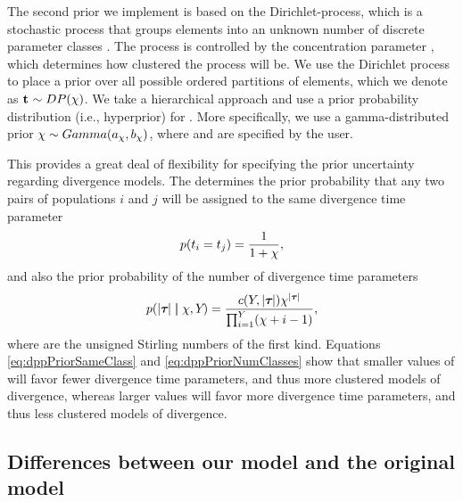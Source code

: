 The second prior we implement is based on the Dirichlet-process, which is a
stochastic process that groups elements into an unknown number of discrete
parameter classes \citep{Ferguson1973,Antoniak1974}.
The process is controlled by the concentration parameter \concentrationParam,
which determines how clustered the process will be.
We use the Dirichlet process to place a prior over all possible ordered
partitions of \npairs{} elements, which we denote as $\mathbf{t_{}} \sim
DP(\chi )$.
We take a hierarchical approach and use a prior probability
distribution (i.e., hyperprior) for \concentrationParam.
More specifically, we use a gamma-distributed prior $\chi \sim
Gamma(a_{\chi}, b_{\chi})$,
where \gammaShape{\concentrationParam} and \gammaScale{\concentrationParam} are
specified by the user.

\begin{linenomath}
This provides a great deal of flexibility for specifying the prior uncertainty
regarding divergence models.
The \concentrationParam determines the prior probability that any two
pairs of populations $i$ and $j$ will be assigned to the same divergence time
parameter
\begin{equation}
    p(t_{i} = t_{j}) = \frac{1}{1 + \chi},
    \label{eq:dppPriorSameClass}
\end{equation}
and also the prior probability of the number of divergence time parameters
\begin{equation}
    p(\lvert \boldsymbol{\tau_{}} \rvert \boldsymbol{\mid} \chi, Y_{}) = 
    \frac{c(Y_{}, \lvert \boldsymbol{\tau_{}} \rvert) \chi^{\lvert \boldsymbol{\tau_{}} \rvert}}
    {\prod_{i=1}^{Y_{}}(\chi + i - 1)},
    \label{eq:dppPriorNumClasses}
\end{equation}
where \stirlingFirst{\cdot}{\cdot} are the unsigned Stirling numbers of the
first kind.
Equations \ref{eq:dppPriorSameClass} and \ref{eq:dppPriorNumClasses} show that
smaller values of \concentrationParam will favor fewer divergence time
parameters, and thus more clustered models of divergence, whereas larger values
will favor more divergence time parameters, and thus less clustered models of
divergence.
\end{linenomath}

\subsection*{Differences between our model and the original \msb model}
